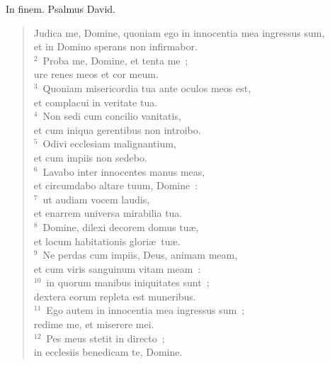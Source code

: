 \lettrine[lines=3,image=true,loversize=0.05,lraise=-0.03]{I}{}n finem. Psalmus David. \begin{flushleft}\begin{verse}\vspace{6pt}Judica me, Domine, quoniam ego in innocentia mea ingressus sum,\\ et in Domino sperans non infirmabor.\\
${}^{2}$~Proba me, Domine, et tenta me~;\\ ure renes meos et cor meum.\\
${}^{3}$~Quoniam misericordia tua ante oculos meos est,\\ et complacui in veritate tua.\\
${}^{4}$~Non sedi cum concilio vanitatis,\\ et cum iniqua gerentibus non introibo.\\
${}^{5}$~Odivi ecclesiam malignantium,\\ et cum impiis non sedebo.\\
${}^{6}$~Lavabo inter innocentes manus meas,\\ et circumdabo altare tuum, Domine~:\\
${}^{7}$~ut audiam vocem laudis,\\ et enarrem universa mirabilia tua.\\
${}^{8}$~Domine, dilexi decorem domus tu\ae ,\\ et locum habitationis glori\ae\ tu\ae .\\
${}^{9}$~Ne perdas cum impiis, Deus, animam meam,\\ et cum viris sanguinum vitam meam~:\\
${}^{10}$~in quorum manibus iniquitates sunt~;\\ dextera eorum repleta est muneribus.\\
${}^{11}$~Ego autem in innocentia mea ingressus sum~;\\ redime me, et miserere mei.\\
${}^{12}$~Pes meus stetit in directo~;\\ in ecclesiis benedicam te, Domine.\end{verse}\end{flushleft}



